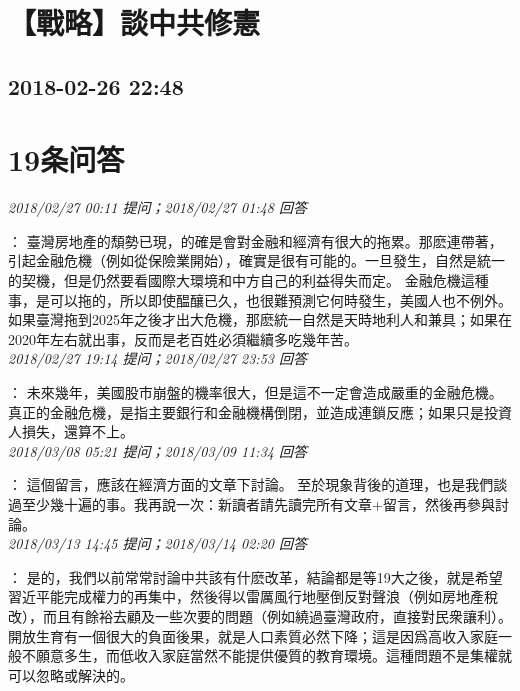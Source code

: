 \documentclass[twocolumn]{ctexart}
\begin{document}
\section{【戰略】談中共修憲}
\subsection{2018-02-26 22:48}


\section{19条问答}

\textit{\hfill\noindent\small 2018/02/27 00:11 提问；2018/02/27 01:48 回答}

：
臺灣房地產的頹勢已現，的確是會對金融和經濟有很大的拖累。那麽連帶著，引起金融危機（例如從保險業開始），確實是很有可能的。一旦發生，自然是統一的契機，但是仍然要看國際大環境和中方自己的利益得失而定。
金融危機這種事，是可以拖的，所以即使醖釀已久，也很難預測它何時發生，美國人也不例外。
如果臺灣拖到2025年之後才出大危機，那麽統一自然是天時地利人和兼具；如果在2020年左右就出事，反而是老百姓必須繼續多吃幾年苦。
\\

\textit{\hfill\noindent\small 2018/02/27 19:14 提问；2018/02/27 23:53 回答}

：
未來幾年，美國股市崩盤的機率很大，但是這不一定會造成嚴重的金融危機。
真正的金融危機，是指主要銀行和金融機構倒閉，並造成連鎖反應；如果只是投資人損失，還算不上。
\\

\textit{\hfill\noindent\small 2018/03/08 05:21 提问；2018/03/09 11:34 回答}

：
這個留言，應該在經濟方面的文章下討論。
至於現象背後的道理，也是我們談過至少幾十遍的事。我再說一次：新讀者請先讀完所有文章+留言，然後再參與討論。
\\

\textit{\hfill\noindent\small 2018/03/13 14:45 提问；2018/03/14 02:20 回答}

：
是的，我們以前常常討論中共該有什麽改革，結論都是等19大之後，就是希望習近平能完成權力的再集中，然後得以雷厲風行地壓倒反對聲浪（例如房地產稅改），而且有餘裕去顧及一些次要的問題（例如繞過臺灣政府，直接對民衆讓利）。
開放生育有一個很大的負面後果，就是人口素質必然下降；這是因爲高收入家庭一般不願意多生，而低收入家庭當然不能提供優質的教育環境。這種問題不是集權就可以忽略或解決的。
\\
\end{document}
